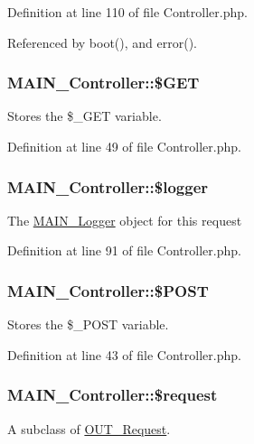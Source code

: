 Definition at line 110 of file Controller.php.

Referenced by boot(), and error().\hypertarget{classMAIN__Controller_aa072e0fbed2a55683b79b6051898b405}{
\subsubsection[{\$GET}]{\setlength{\rightskip}{0pt plus 5cm}MAIN\_\-Controller::\$GET}}
\label{d0/d6f/classMAIN__Controller_aa072e0fbed2a55683b79b6051898b405}
Stores the \$\_\-GET variable. 

Definition at line 49 of file Controller.php.\hypertarget{classMAIN__Controller_a7fa8fc6630663c9024016edbba1f9fa5}{
\subsubsection[{\$logger}]{\setlength{\rightskip}{0pt plus 5cm}MAIN\_\-Controller::\$logger}}
\label{d0/d6f/classMAIN__Controller_a7fa8fc6630663c9024016edbba1f9fa5}
The \hyperlink{classMAIN__Logger}{MAIN\_\-Logger} object for this request 

Definition at line 91 of file Controller.php.\hypertarget{classMAIN__Controller_a340814c812daea328ea667392bf3dbac}{
\subsubsection[{\$POST}]{\setlength{\rightskip}{0pt plus 5cm}MAIN\_\-Controller::\$POST}}
\label{d0/d6f/classMAIN__Controller_a340814c812daea328ea667392bf3dbac}
Stores the \$\_\-POST variable. 

Definition at line 43 of file Controller.php.\hypertarget{classMAIN__Controller_aeb53199b16ee35291df91c7cc97148a7}{
\subsubsection[{\$request}]{\setlength{\rightskip}{0pt plus 5cm}MAIN\_\-Controller::\$request}}
\label{d0/d6f/classMAIN__Controller_aeb53199b16ee35291df91c7cc97148a7}
A subclass of \hyperlink{classOUT__Request}{OUT\_\-Request}. 

